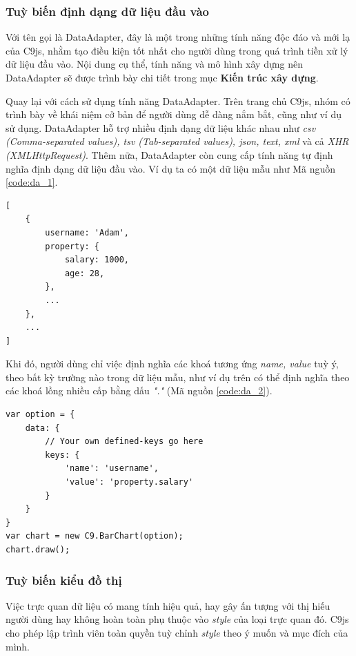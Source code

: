 \documentclass[12pt,a4paper]{article}
\begin{document}
\subsubsection{Tuỳ biến định dạng dữ liệu đầu vào}
Với tên gọi là DataAdapter, đây là một trong những tính năng độc đáo và mới lạ của C9js, nhằm tạo điều kiện tốt nhất cho người dùng trong quá trình tiền xử lý dữ liệu đầu vào. Nội dung cụ thể, tính năng và mô hình xây dựng nên DataAdapter sẽ được trình bày chi tiết trong mục \textbf{Kiến trúc xây dựng}.

Quay lại với cách sử dụng tính năng DataAdapter. Trên trang chủ C9js, nhóm có trình bày về khái niệm cở bản để người dùng dễ dàng nắm bắt, cũng như ví dụ sử dụng. DataAdapter hỗ trợ nhiều định dạng dữ liệu khác nhau như \textit{csv (Comma-separated values), tsv (Tab-separated values), json, text, xml} và cả \textit{XHR (XMLHttpRequest)}\cite{xhr}\cite{csv}\cite{tsv}. Thêm nữa, DataAdapter còn cung cấp tính năng tự định nghĩa định dạng dữ liệu đầu vào. Ví dụ ta có một dữ liệu mẫu như Mã nguồn \ref{code:da_1}.

\begin{lstlisting}[caption=Một dữ liệu mẫu với các thuộc tính lồng nhiều cấp, label={code:da_1}]
[
	{
		username: 'Adam',
		property: {
			salary: 1000,
			age: 28,
		},
		...
	},
	...
]
\end{lstlisting}

Khi đó, người dùng chỉ việc định nghĩa các khoá tương ứng \textit{name, value} tuỳ ý, theo bất kỳ trường nào trong dữ liệu mẫu, như ví dụ trên có thể định nghĩa theo các khoá lồng nhiều cấp bằng dấu \textit{"."} (Mã nguồn \ref{code:da_2}).

\begin{lstlisting}[caption=Định nghĩa định dạng dữ liệu đầu vào với C9js, label={code:da_2}]
var option = {
    data: {
        // Your own defined-keys go here
        keys: {
            'name': 'username',
            'value': 'property.salary'
        }
    }
}
var chart = new C9.BarChart(option);
chart.draw();
\end{lstlisting}

\subsubsection{Tuỳ biến kiểu đồ thị}
Việc trực quan dữ liệu có mang tính hiệu quả, hay gây ấn tượng với thị hiếu người dùng hay không hoàn toàn phụ thuộc vào \textit{style} của loại trực quan đó. C9js cho phép lập trình viên toàn quyền tuỳ chỉnh \textit{style} theo ý muốn và mục đích của mình.
\end{document}

